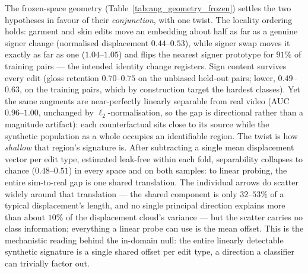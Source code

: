 The frozen-space geometry (Table~\ref{tab:aug_geometry_frozen}) settles
the two hypotheses in favour of their \emph{conjunction}, with one twist.
The locality ordering holds: garment and skin edits move an embedding
about half as far as a genuine signer change (normalised displacement
$0.44$--$0.53$), while signer swap moves it exactly as far as one
($1.04$--$1.05$) and flips the nearest signer prototype for $91\%$ of
training pairs --- the intended identity change registers. Sign content
survives every edit (gloss retention $0.70$--$0.75$ on the unbiased
held-out pairs; lower, $0.49$--$0.63$, on the training pairs, which by
construction target the hardest classes).
 Yet the same augments are
near-perfectly linearly separable from real video (AUC $0.96$--$1.00$,
unchanged by $\ell_2$-normalisation, so the gap is directional rather
than a magnitude artifact): each counterfactual sits close to its source
while the synthetic population as a whole occupies an identifiable
region.
The twist is how \emph{shallow} that region's signature is.
After subtracting a single mean displacement vector per edit type,
estimated leak-free within each fold, separability collapses to chance
($0.48$--$0.51$) in every space and on both samples: to linear probing,
the entire sim-to-real gap is one shared translation. The individual
arrows do scatter widely around that translation --- the shared
component is only $32$--$53\%$ of a typical displacement's length, and
no single principal direction explains more than about $10\%$ of the
displacement cloud's variance --- but the scatter carries no class
information; everything a linear probe can use is the mean offset. This
is the mechanistic reading behind the in-domain null: the entire
linearly detectable synthetic signature is a single shared offset per
edit type, a direction a classifier can trivially factor out.

